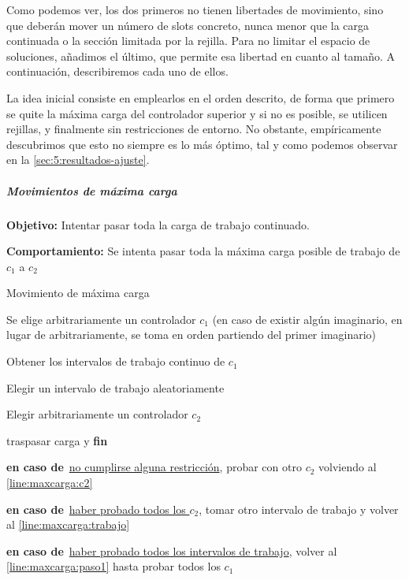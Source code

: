 Como podemos ver, los dos primeros no tienen libertades de movimiento, sino que deberán mover un número de slots concreto, nunca menor que la carga continuada o la sección limitada por la rejilla. Para no limitar el espacio de soluciones, añadimos el último, que permite esa libertad en cuanto al tamaño. A continuación, describiremos cada uno de ellos.

La idea inicial consiste en emplearlos en el orden descrito, de forma que primero se quite la máxima carga del controlador superior y si no es posible, se utilicen rejillas, y finalmente sin restricciones de entorno. No obstante, empíricamente descubrimos que esto no siempre es lo más óptimo, tal y como podemos observar en la \autoref{sec:5:resultados-ajuste}.

\subparagraph{Movimientos de máxima carga}
\label{entorno:movMaxCarga}

\textbf{Objetivo:} Intentar pasar toda la carga de trabajo continuado.

\textbf{Comportamiento:} Se intenta pasar toda la máxima carga posible de trabajo de $c_1$ a $c_2$

\SetAlgoNoLine
\LinesNumbered
\SetAlgoNoEnd
\DontPrintSemicolon
\begin{algorithm}[h]
    \label{algoritmo:movMaxCarga}
    
   	\caption{Movimiento de máxima carga}
    	
    \SetAlgoNoEnd
    Se elige arbitrariamente un controlador $c_1$ (en caso de existir algún imaginario, en lugar de arbitrariamente, se toma en orden partiendo \newline del primer imaginario) \label{line:maxcarga:paso1}\;
    \algovspace

    Obtener los intervalos de trabajo continuo de $c_1$\;
    \algovspace

    Elegir un intervalo de trabajo aleatoriamente \label{line:maxcarga:trabajo}\;
    \algovspace

    Elegir arbitrariamente un controlador $c_2$ \label{line:maxcarga:c2}\;
    \algovspace

    {traspasar carga y \textbf{fin}}
    \algovspace

    \textbf{en caso de\,} \underline{no cumplirse alguna restricción}, probar con otro $c_2$ volviendo al \autoref{line:maxcarga:c2}\;
    \algovspace

    \textbf{en caso de\,} \underline{haber probado todos los $c_2$}, tomar otro intervalo de trabajo y volver al \autoref{line:maxcarga:trabajo}\;
    \algovspace

    \textbf{en caso de\,} \underline{haber probado todos los intervalos de trabajo}, volver al \autoref{line:maxcarga:paso1} hasta probar todos los $c_1$\;
    \algovspace
\end{algorithm}

